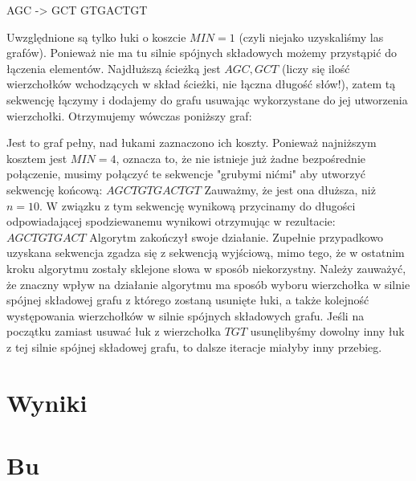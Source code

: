 \documentclass[a4paper,10pt]{article}
\begin{document}
AGC -> GCT         GTGACTGT

Uwzględnione są tylko łuki o koszcie $MIN=1$ (czyli niejako uzyskaliśmy las grafów). Ponieważ nie ma tu silnie spójnych składowych możemy przystąpić do łączenia elementów. Najdłuższą ścieżką jest $AGC, GCT$ (liczy się ilość wierzchołków wchodzących w skład ścieżki, nie łączna długość słów!), zatem tą sekwencję łączymy i dodajemy do grafu usuwając wykorzystane do jej utworzenia wierzchołki.
Otrzymujemy wówczas poniższy graf:

		 
Jest to graf pełny, nad łukami zaznaczono ich koszty. Ponieważ najniższym kosztem jest $MIN=4$, oznacza to, że nie istnieje już żadne bezpośrednie połączenie, musimy połączyć te sekwencje "grubymi nićmi" aby utworzyć sekwencję końcową:
$AGCTGTGACTGT$
Zauważmy, że jest ona dłuższa, niż $n=10$. W związku z tym sekwencję wynikową przycinamy do długości odpowiadającej spodziewanemu wynikowi otrzymując w rezultacie:
$AGCTGTGACT$
Algorytm zakończył swoje działanie. Zupełnie przypadkowo uzyskana sekwencja zgadza się z sekwencją wyjściową, mimo tego, że w ostatnim kroku algorytmu zostały sklejone słowa w sposób niekorzystny.
Należy zauważyć, że znaczny wpływ na działanie algorytmu ma sposób wyboru wierzchołka w silnie spójnej składowej grafu z którego zostaną usunięte łuki, a także kolejność występowania wierzchołków w silnie spójnych składowych grafu. Jeśli na początku zamiast usuwać łuk z wierzchołka $TGT$ usunęlibyśmy dowolny inny łuk z tej silnie spójnej składowej grafu, to dalsze iteracje miałyby inny przebieg.


\section{Wyniki}

\section{Bu}
\end{document}
